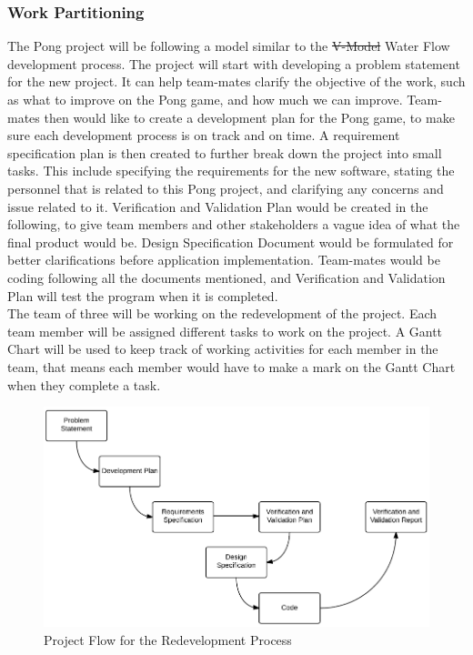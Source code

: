 \documentclass[12pt,letterpaper]{article}
\begin{document}
	\subsubsection{Work Partitioning}
	The Pong project will be following a model similar to the \st{V-Model} Water Flow development process. The project will start with developing a problem statement for the new project. It can help team-mates clarify the objective of the work, such as what to improve on the Pong game, and how much we can improve. Team-mates then would like to create a development plan for the Pong game, to make sure each development process is on track and on time. A requirement specification plan is then created to further break down the project into small tasks. This include specifying the requirements for the new software, stating the personnel that is related to this Pong project, and clarifying any concerns and issue related to it. Verification and Validation Plan would be created in the following, to give team members and other stakeholders a vague idea of what the final product would be. Design Specification Document would be formulated for better clarifications before application implementation. Team-mates would be coding following all the documents mentioned, and Verification and Validation Plan will test the program when it is completed.\\

\noindent The team of three will be working on the redevelopment of the project. Each team member will be assigned different tasks to work on the project. A Gantt Chart will be used to keep track of working activities for each member in the team, that means each member would have to make a mark on the Gantt Chart when they complete a task. \\

\begin{figure}[h]
  \includegraphics[scale=0.6]{ProjectFlow.png}
  \caption{Project Flow for the Redevelopment Process}
\end{figure}
\end{document}
